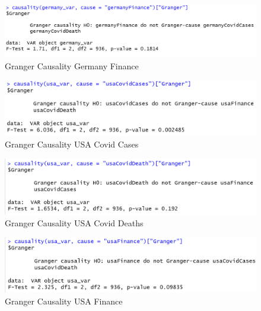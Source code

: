 \documentclass[11pt]{article}
\begin{document}
\begin{figure}[!h]
\centering
  \includegraphics[width=\textwidth]{R-Code/Causalities/Germany_F.png}  
  \caption{Granger Causality Germany Finance}
  \end{figure}
  
  
\begin{figure}[!h]
\centering
  \includegraphics[width=\textwidth]{R-Code/Causalities/US_CC.png}  
  \caption{Granger Causality USA Covid Cases}
  \end{figure}
\begin{figure}[!h]
\centering
  \includegraphics[width=\textwidth]{R-Code/Causalities/US_CD.png}  
  \caption{Granger Causality USA Covid Deaths}
  \end{figure}
 
\begin{figure}[!h]
\centering
  \includegraphics[width=\textwidth]{R-Code/Causalities/US_F.png}  
  \caption{Granger Causality USA Finance}
  \label{fig:grangerUSA}
  \end{figure}
\clearpage
\medskip
\newpage

\nocite{*} 
 
\end{document}
